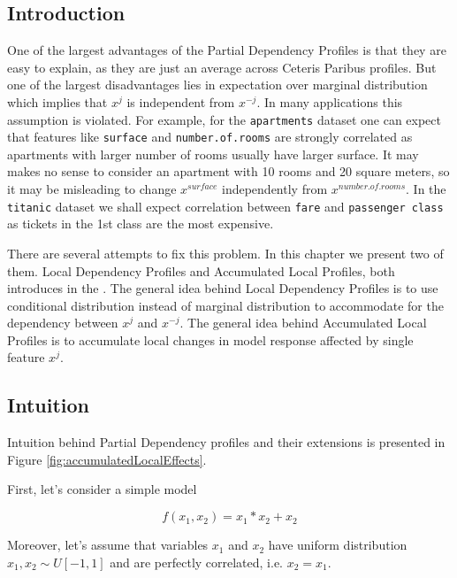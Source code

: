 \documentclass[12pt,]{krantz}
\begin{document}
\hypertarget{ALPIntro}{%
\subsection{Introduction}\label{ALPIntro}}

One of the largest advantages of the Partial Dependency Profiles is that they are easy to explain, as they are just an average across Ceteris Paribus profiles. But one of the largest disadvantages lies in expectation over marginal distribution which implies that \(x^j\) is independent from \(x^{-j}\). In many applications this assumption is violated. For example, for the \texttt{apartments} dataset one can expect that features like \texttt{surface} and \texttt{number.of.rooms} are strongly correlated as apartments with larger number of rooms usually have larger surface. It may makes no sense to consider an apartment with 10 rooms and 20 square meters, so it may be misleading to change \(x^{surface}\) independently from \(x^{number.of.rooms}\). In the \texttt{titanic} dataset we shall expect correlation between \texttt{fare} and \texttt{passenger\ class} as tickets in the 1st class are the most expensive.

There are several attempts to fix this problem. In this chapter we present two of them. Local Dependency Profiles and Accumulated Local Profiles, both introduces in the \citep{ALEPlotRPackage}.
The general idea behind Local Dependency Profiles is to use conditional distribution instead of marginal distribution to accommodate for the dependency between \(x^j\) and \(x^{-j}\).
The general idea behind Accumulated Local Profiles is to accumulate local changes in model response affected by single feature \(x^j\).

\hypertarget{ALPIntuition}{%
\subsection{Intuition}\label{ALPIntuition}}

Intuition behind Partial Dependency profiles and their extensions is presented in Figure \ref{fig:accumulatedLocalEffects}.

First, let's consider a simple model

\begin{equation}
f(x_1, x_2) = x_1 * x_2 + x_2
\label{eq:trickyModel}
\end{equation}

Moreover, let's assume that variables \(x_1\) and \(x_2\) have uniform distribution \(x_1, x_2 \sim U[-1,1]\) and are perfectly correlated, i.e. \(x_2 = x_1\).
\end{document}
